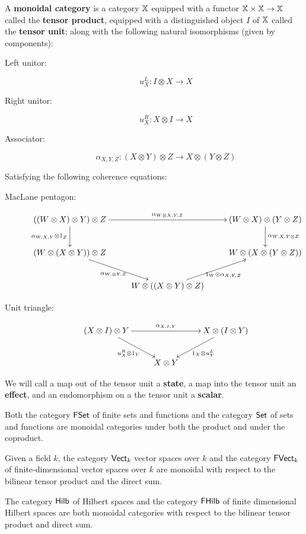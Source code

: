 \begin{definition}
A {\bf monoidal category} is a category $\mathbb{X}$ equipped with a functor $\mathbb{X}\times\mathbb{X}\to \mathbb{X}$ called the {\bf tensor product}, equipped with a distinguished object $I$ of $\mathbb{X}$ called the {\bf tensor unit}; along with the following natural isomorphisms (given by components):

\begin{description}
\item[Left unitor:]
$$
u_X^L:I\otimes X \to X
$$
\item[Right unitor:]
$$
u_X^R: X\otimes I \to X
$$
\item[Associator:]
$$
\alpha_{X,Y,Z}:(X\otimes Y)\otimes Z \to X\otimes(Y\otimes Z)
$$
\end{description}

Satisfying the following coherence equations:

\begin{description}
\item[MacLane pentagon:]


$$
\xymatrix{
  ((W\otimes X )\otimes Y)\otimes Z \ar[rr]^{\alpha_{W\otimes X,Y,Z}} \ar[d]_{\alpha_{W,X,Y}\otimes 1_Z}
    &
    & (W\otimes X )\otimes (Y\otimes Z) \ar[d]^{\alpha_{W, X,Y\otimes Z}}
  \\  (W\otimes(X\otimes Y))\otimes Z \ar[dr]_{\alpha_{W,\otimes Y,Z}}
    & 
    & W\otimes (X\otimes(Y\otimes Z)) 
  \\&
    W\otimes ((X\otimes Y)\otimes Z) \ar[ur]_{1_W\otimes \alpha_{X,Y,Z}}
}
$$

\item[Unit triangle:]

$$
\xymatrix{
  (X\otimes I)\otimes Y \ar[rr]^{\alpha_{X,I,Y}} \ar[dr]_{u_X^{R}\otimes 1_Y}
    &
    & X\otimes (I\otimes Y) \ar[dl]^{1_X\otimes u_Y^{L}}\\
  & X\otimes Y
}
$$

\end{description}


We will call a map out of the tensor unit a {\bf state}, a map into the tensor unit an {\bf effect}, and an endomorphism on a the tensor unit a {\bf scalar}.
\end{definition}


\begin{example}
Both the category $\mathsf{FSet}$ of finite sets and functions and the category $\mathsf{Set}$ of sets and functions are monoidal categories under both the product and under the coproduct.

Given a field $k$, the category $\mathsf{Vect}_k$ vector spaces over $k$  and the category $\mathsf{FVect}_k$ of finite-dimensional vector spaces over $k$ are monoidal with respect to the bilinear tensor product and the direct sum.

The category $\mathsf{Hilb}$ of Hilbert spaces and the category $\mathsf{FHilb}$ of finite dimensional Hilbert spaces are both monoidal categories with respect to the bilinear tensor product and direct sum.
\end{example}



